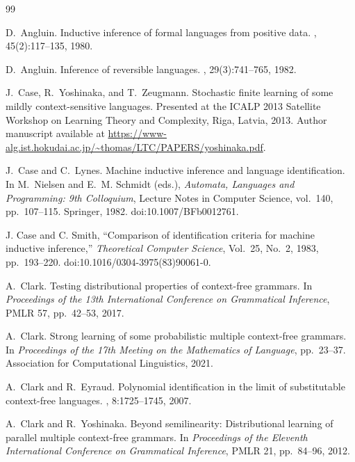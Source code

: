 \documentclass[11pt,a4paper]{ltjsarticle}
\numberwithin{equation}{section}
\theoremstyle{plain}
\theoremstyle{definition}
\theoremstyle{remark}
\begin{document}
\begin{thebibliography}{99}

D.~Angluin.
\newblock Inductive inference of formal languages from positive data.
, 45(2):117--135, 1980.

D.~Angluin.
\newblock Inference of reversible languages.
, 29(3):741--765, 1982.

J.~Case, R.~Yoshinaka, and T.~Zeugmann.
\newblock Stochastic finite learning of some mildly context-sensitive languages.
\newblock Presented at the ICALP 2013 Satellite Workshop on Learning Theory and
Complexity, Riga, Latvia, 2013.
\newblock Author manuscript available at
\url{https://www-alg.ist.hokudai.ac.jp/~thomas/LTC/PAPERS/yoshinaka.pdf}.

J.~Case and C.~Lynes.
\newblock Machine inductive inference and language identification.
\newblock In M.~Nielsen and E.~M. Schmidt (eds.), \emph{Automata, Languages
and Programming: 9th Colloquium}, Lecture Notes in Computer Science, vol.~140,
pp.~107--115. Springer, 1982.
\newblock doi:10.1007/BFb0012761.

J. Case and C. Smith,
``Comparison of identification criteria for machine inductive inference,''
\emph{Theoretical Computer Science},
Vol.~25, No.~2, 1983, pp.~193--220.
doi:10.1016/0304-3975(83)90061-0.

A.~Clark.
\newblock Testing distributional properties of context-free grammars.
\newblock In {\em Proceedings of the 13th International Conference on
Grammatical Inference}, PMLR 57, pp.~42--53, 2017.

A.~Clark.
\newblock Strong learning of some probabilistic multiple context-free grammars.
\newblock In {\em Proceedings of the 17th Meeting on the Mathematics of Language},
pp.~23--37. Association for Computational Linguistics, 2021.

A.~Clark and R.~Eyraud.
\newblock Polynomial identification in the limit of substitutable context-free
languages.
, 8:1725--1745, 2007.

A.~Clark and R.~Yoshinaka.
\newblock Beyond semilinearity: Distributional learning of parallel multiple
context-free grammars.
\newblock In {\em Proceedings of the Eleventh International Conference on
Grammatical Inference}, PMLR 21, pp.~84--96, 2012.


\end{thebibliography}
\end{document}

